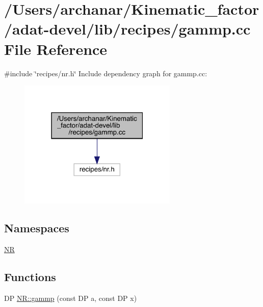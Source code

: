 \hypertarget{adat-devel_2lib_2recipes_2gammp_8cc}{}\section{/\+Users/archanar/\+Kinematic\+\_\+factor/adat-\/devel/lib/recipes/gammp.cc File Reference}
\label{adat-devel_2lib_2recipes_2gammp_8cc}
{\ttfamily \#include \char`\"{}recipes/nr.\+h\char`\"{}}\newline
Include dependency graph for gammp.\+cc\+:
\nopagebreak
\begin{figure}[H]
\begin{center}
\leavevmode
\includegraphics[width=214pt]{d0/d34/adat-devel_2lib_2recipes_2gammp_8cc__incl}
\end{center}
\end{figure}
\subsection*{Namespaces}
\begin{DoxyCompactItemize}
\item 
 \mbox{\hyperlink{namespaceNR}{NR}}
\end{DoxyCompactItemize}
\subsection*{Functions}
\begin{DoxyCompactItemize}
\item 
DP \mbox{\hyperlink{namespaceNR_ad617f7290581d8abbf35fb5e8206ffc8}{N\+R\+::gammp}} (const DP a, const DP x)
\end{DoxyCompactItemize}
